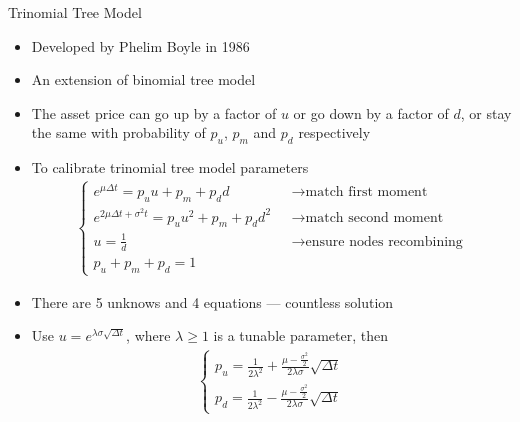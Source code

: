 \begin{frame}{Trinomial Tree Model}
    \begin{itemize}
        \item Developed by Phelim Boyle in 1986
        \item An extension of binomial tree model
        \item The asset price can go up by a factor of $u$ or go down by a factor of $d$, or stay the same
with probability of $p_u$, $p_m$ and $p_d$ respectively
    \end{itemize}
\begin{center}
\end{center}
\end{frame}

\begin{frame}
\begin{itemize}
\item To calibrate trinomial tree model parameters
\begin{align}
\begin{cases}
    e^{\mu \Delta t} = p_u u + p_m + p_d d  &~~~\rightarrow  \text{match first moment} \\
    e^{2\mu \Delta t + \sigma^2 t} = p_u u^2 + p_m + p_d d^2  &~~~\rightarrow \text{match second moment} \\
    u = \frac1d  &~~~\rightarrow \text{ensure nodes recombining} \\
    p_u + p_m + p_d = 1   ~~~~ &
\end{cases}
\end{align}
\item There are 5 unknows and 4 equations --- countless solution
\item Use $u = e^{\lambda \sigma \sqrt{\Delta t}}$, where $\lambda \geq 1 $ is a tunable parameter, then
    \begin{align}
        \begin{cases}
        p_u = \frac1{2\lambda^2} + \frac{\mu - \frac{\sigma^2}2}{2 \lambda \sigma} \sqrt{\Delta t} \\
        p_d = \frac1{2\lambda^2} - \frac{\mu - \frac{\sigma^2}2}{2 \lambda \sigma} \sqrt{\Delta t}
\end{cases}
    \end{align}
\end{itemize}
\end{frame}

